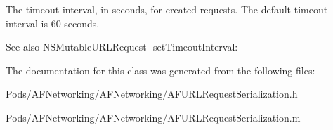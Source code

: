 The timeout interval, in seconds, for created requests. The default timeout interval is 60 seconds.

\begin{DoxySeeAlso}{See also}
N\+S\+Mutable\+U\+R\+L\+Request -\/set\+Timeout\+Interval\+: 
\end{DoxySeeAlso}


The documentation for this class was generated from the following files\+:\begin{DoxyCompactItemize}
\item 
Pods/\+A\+F\+Networking/\+A\+F\+Networking/A\+F\+U\+R\+L\+Request\+Serialization.\+h\item 
Pods/\+A\+F\+Networking/\+A\+F\+Networking/A\+F\+U\+R\+L\+Request\+Serialization.\+m\end{DoxyCompactItemize}
